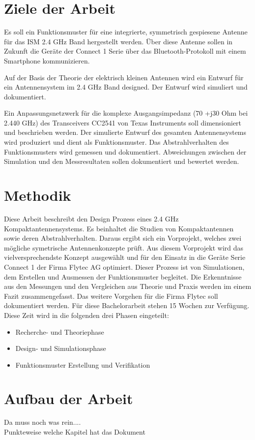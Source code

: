\section{Ziele der Arbeit}
Es soll ein Funktionsmuster für eine integrierte, symmetrisch gespiesene Antenne für das ISM 2.4 GHz Band hergestellt werden. Über diese Antenne sollen in Zukunft die Geräte der \glqq Connect 1 \grqq Serie über das Bluetooth-Protokoll mit einem Smartphone kommunizieren. 

Auf der Basis der Theorie der elektrisch kleinen Antennen wird ein Entwurf für ein Antennensystem im 2.4 GHz Band designed. Der Entwurf wird simuliert und dokumentiert. 

Ein Anpassungsnetzwerk  für die komplexe Ausgangsimpedanz (70 +j30 Ohm bei 2.440 GHz) des Transceivers CC2541 von Texas Instruments soll dimensioniert und beschrieben werden.
Der simulierte Entwurf des gesamten Antennensystems wird produziert und dient als Funktionsmuster. Das Abstrahlverhalten des Funktionsmusters wird gemessen und dokumentiert.
Abweichungen zwischen der Simulation und den Messresultaten sollen dokumentiert und bewertet werden.
\section{Methodik}
Diese  Arbeit beschreibt den Design Prozess eines 2.4 GHz Kompaktantennensystems. Es beinhaltet die Studien von Kompaktantennen sowie deren Abstrahlverhalten. Daraus ergibt sich ein  Vorprojekt, welches zwei mögliche symetrische Antennenkonzepte prüft. Aus diesem Vorprojekt wird das vielversprechendste Konzept ausgewählt und für den Einsatz in die Geräte Serie \glqq Connect 1 \grqq der Firma Flytec AG optimiert. Dieser Prozess ist von Simulationen, dem  Erstellen und Ausmessen der Funktionsmuster begleitet. Die Erkenntnisse aus den Messungen und den Vergleichen aus Theorie und Praxis werden im einem Fazit zusammengefasst. Das weitere Vorgehen für die Firma Flytec soll dokumentiert werden. Für diese Bachelorarbeit stehen 15 Wochen zur Verfügung. Diese Zeit wird in die folgenden drei Phasen eingeteilt:
\begin{itemize}
	\item Recherche- und Theoriephase
	\item Design- und Simulationsphase 
	\item Funktionsmuster Erstellung und Verifikation
\end{itemize}

\section{Aufbau der Arbeit}
Da muss noch was rein....\\
Punkteweise welche Kapitel hat das Dokument





